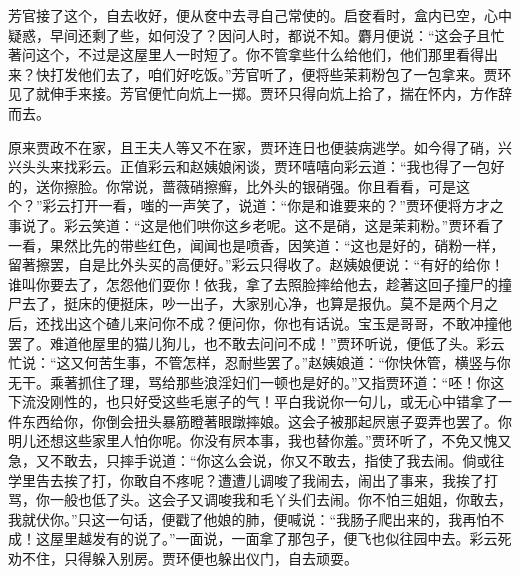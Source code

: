\begin{parag}


    芳官接了这个，自去收好，便从奁中去寻自己常使的。启奁看时，盒内已空，心中疑惑，早间还剩了些，如何没了？因问人时，都说不知。麝月便说：“这会子且忙著问这个，不过是这屋里人一时短了。你不管拿些什么给他们，他们那里看得出来？快打发他们去了，咱们好吃饭。”芳官听了，便将些茉莉粉包了一包拿来。贾环见了就伸手来接。芳官便忙向炕上一掷。贾环只得向炕上拾了，揣在怀内，方作辞而去。
\end{parag}


\begin{parag}


    原来贾政不在家，且王夫人等又不在家，贾环连日也便装病逃学。如今得了硝，兴兴头头来找彩云。正值彩云和赵姨娘闲谈，贾环嘻嘻向彩云道：“我也得了一包好的，送你擦脸。你常说，蔷薇硝擦癣，比外头的银硝强。你且看看，可是这个？”彩云打开一看，嗤的一声笑了，说道：“你是和谁要来的？”贾环便将方才之事说了。彩云笑道：“这是他们哄你这乡老呢。这不是硝，这是茉莉粉。”贾环看了一看，果然比先的带些红色，闻闻也是喷香，因笑道：“这也是好的，硝粉一样，留著擦罢，自是比外头买的高便好。”彩云只得收了。赵姨娘便说：“有好的给你！谁叫你要去了，怎怨他们耍你！依我，拿了去照脸摔给他去，趁著这回子撞尸的撞尸去了，挺床的便挺床，吵一出子，大家别心净，也算是报仇。莫不是两个月之后，还找出这个碴儿来问你不成？便问你，你也有话说。宝玉是哥哥，不敢冲撞他罢了。难道他屋里的猫儿狗儿，也不敢去问问不成！”贾环听说，便低了头。彩云忙说：“这又何苦生事，不管怎样，忍耐些罢了。”赵姨娘道：“你快休管，横竖与你无干。乘著抓住了理，骂给那些浪淫妇们一顿也是好的。”又指贾环道：“呸！你这下流没刚性的，也只好受这些毛崽子的气！平白我说你一句儿，或无心中错拿了一件东西给你，你倒会扭头暴筋瞪著眼蹾摔娘。这会子被那起屄崽子耍弄也罢了。你明儿还想这些家里人怕你呢。你没有屄本事，我也替你羞。”贾环听了，不免又愧又急，又不敢去，只摔手说道：“你这么会说，你又不敢去，指使了我去闹。倘或往学里告去挨了打，你敢自不疼呢？遭遭儿调唆了我闹去，闹出了事来，我挨了打骂，你一般也低了头。这会子又调唆我和毛丫头们去闹。你不怕三姐姐，你敢去，我就伏你。”只这一句话，便戳了他娘的肺，便喊说：“我肠子爬出来的，我再怕不成！这屋里越发有的说了。”一面说，一面拿了那包子，便飞也似往园中去。彩云死劝不住，只得躲入别房。贾环便也躲出仪门，自去顽耍。
\end{parag}


